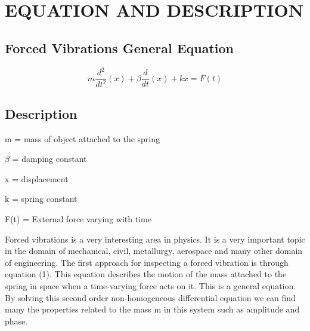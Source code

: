 \section{EQUATION AND DESCRIPTION}

\subsection{Forced Vibrations General Equation}

\begin{equation}

    m\frac{d^2}{dt^2}(x)+\beta\frac{d}{dt}(x)+kx=F(t)

\end{equation}

\subsection{Description}

\begin{center}

m = mass of object attached to the spring

\newlines

$\beta$ = damping constant

\newline

x = displacement

\newline

k = spring constant

\newline

F(t) = External force varying with time

\end{center}

Forced vibrations is a very interesting area in physics. It is a very important topic in the domain of mechanical, civil, metallurgy, aerospace and many other domain of engineering. The first approach for inspecting a forced vibration is through equation (1). This equation describes the motion of the mass attached to the spring in space when a time-varying force acts on it. This is a general equation. By solving this second order non-homogeneous differential equation we can find many the properties related to the mass m in this system such as amplitude and phase.













